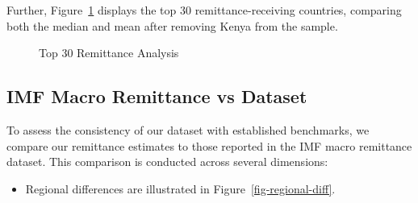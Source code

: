 \documentclass[
  11pt,
]{article}
\providecommand{\tightlist}{%
  \setlength{\itemsep}{0pt}\setlength{\parskip}{0pt}}\usepackage{longtable,booktabs,array}
\begin{document}
Further, Figure~\ref{fig-top30-remittance} displays the top 30
remittance-receiving countries, comparing both the median and mean after
removing Kenya from the sample.

\begin{figure}[H]


\caption{\label{fig-top30-remittance}Top 30 Remittance Analysis}

\end{figure}%

\subsection{IMF Macro Remittance vs
Dataset}\label{imf-macro-remittance-vs-dataset}

To assess the consistency of our dataset with established benchmarks, we
compare our remittance estimates to those reported in the IMF macro
remittance dataset. This comparison is conducted across several
dimensions:

\begin{itemize}
\tightlist
\item
  Regional differences are illustrated in
  Figure~\ref{fig-regional-diff}.
\end{itemize}
\end{document}
